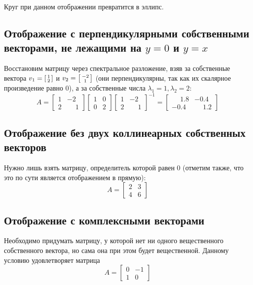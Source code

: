 \documentclass[a4paper,hidelinks,14pt]{extarticle}
\begin{document}
	Круг при данном отображении превратится в эллипс.
	
	\subsection{Отображение с перпендикулярными собственными векторами, не лежащими на $y=0$ и $y=x$}
	Восстановим матрицу через спектральное разложение, взяв за собственные вектора $v_1=\begin{bsmallmatrix}
		1 \\
		2
	\end{bsmallmatrix}
	$ и $v_2=\begin{bsmallmatrix}
		-2 \\
		1
	\end{bsmallmatrix}
	$ (они перпендикулярны, так как их скалярное произведение равно 0), а за собственные числа $\lambda_1=1, \lambda_2=2$:
	$$
	A =
	\begin{bmatrix}
		1 & -2 \\
		2 & \phantom{-}1
	\end{bmatrix}
	\begin{bmatrix}
		1 & 0 \\
		0 & 2
	\end{bmatrix}
	\begin{bmatrix}
		1 & -2 \\
		2 & \phantom{-}1
	\end{bmatrix}^{-1}
	=
	\begin{bmatrix}
		\phantom{-}1.8 & -0.4 \\
		-0.4 & \phantom{-}1.2
	\end{bmatrix}
	$$
	\subsection{Отображение без двух коллинеарных собственных векторов}
	Нужно лишь взять матрицу, определитель которой равен 0 (отметим также, что это по сути является отображением в прямую):
	$$
	A = \begin{bmatrix}
		2 & 3 \\
		4 & 6
	\end{bmatrix}
	$$
	\subsection{Отображение с комплексными векторами}
	Необходимо придумать матрицу, у которой нет ни одного вещественного собственного вектора, но сама она при этом будет вещественной.
	Данному условию удовлетворяет матрица
	$$
	A = \begin{bmatrix}
		0 & -1 \\
		1 & 0
	\end{bmatrix}
	$$
	
\end{document}
